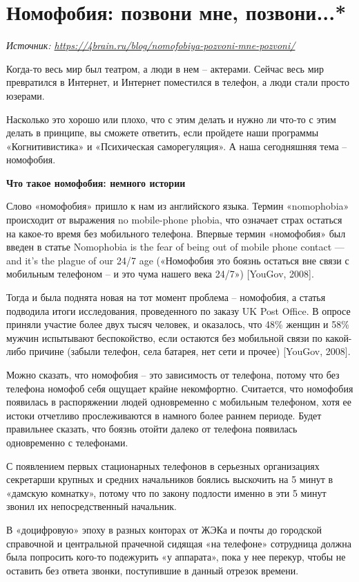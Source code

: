 \newpage
\section{Номофобия: позвони мне, позвони...*}

\textit{Источник: \url{https://4brain.ru/blog/nomofobiya-pozvoni-mne-pozvoni/}}

Когда-то весь мир был театром, а люди в нем – актерами. Сейчас весь мир превратился в Интернет, и Интернет поместился в телефон, а люди стали просто юзерами.

Насколько это хорошо или плохо, что с этим делать и нужно ли что-то с этим делать в принципе, вы сможете ответить, если пройдете наши программы «Когнитивистика» и «Психическая саморегуляция». А наша сегодняшняя тема – номофобия.

\textbf{Что такое номофобия: немного истории}

Слово «номофобия» пришло к нам из английского языка. Термин «nomophobia» происходит от выражения no mobile-phone phobia, что означает страх остаться на какое-то время без мобильного телефона. Впервые термин «номофобия» был введен в статье Nomophobia is the fear of being out of mobile phone contact  ---  and it’s the plague of our 24/7 age («Номофобия это боязнь остаться вне связи с мобильным телефоном – и это чума нашего века 24/7») [YouGov, 2008].

Тогда и была поднята новая на тот момент проблема – номофобия, а статья подводила итоги исследования, проведенного по заказу UK Post Office. В опросе приняли участие более двух тысяч человек, и оказалось, что 48\% женщин и 58\% мужчин испытывают беспокойство, если остаются без мобильной связи по какой-либо причине (забыли телефон, села батарея, нет сети и прочее) [YouGov, 2008].

Можно сказать, что номофобия – это зависимость от телефона, потому что без телефона номофоб себя ощущает крайне некомфортно. Считается, что номофобия появилась в распоряжении людей одновременно с мобильным телефоном, хотя ее истоки отчетливо прослеживаются в намного более раннем периоде. Будет правильнее сказать, что боязнь отойти далеко от телефона появилась одновременно с телефонами.

С появлением первых стационарных телефонов в серьезных организациях секретарши крупных и средних начальников боялись выскочить на 5 минут в «дамскую комнатку», потому что по закону подлости именно в эти 5 минут звонил их непосредственный начальник.

В «доцифровую» эпоху в разных конторах от ЖЭКа и почты до городской справочной и центральной прачечной сидящая «на телефоне» сотрудница должна была попросить кого-то подежурить «у аппарата», пока у нее перекур, чтобы не оставить без ответа звонки, поступившие в данный отрезок времени.

